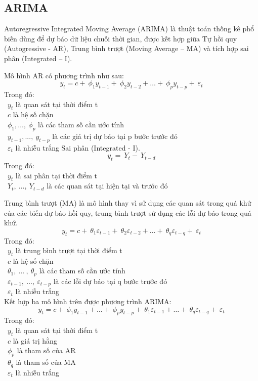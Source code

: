 \subsection{ARIMA}
Autoregressive Integrated Moving Average (ARIMA) là thuật toán thống kê phổ biến dùng để dự báo dữ liệu chuỗi thời gian, được kết hợp giữa Tự hồi quy (Autogressive - AR), Trung bình trượt (Moving Average – MA) và tích hợp sai phân (Integrated – I).
\par
Mô hình AR có phương trình như sau:
\[y_{t} = c + \ \phi_{1}y_{t - 1} + \ \phi_{2}y_{t - 2} + \ldots + \ \phi_{p}y_{t - p} + \ \varepsilon_{t}\]
Trong đó:\\
    \indent\textbullet\ \(y_{t}\) là quan sát tại thời điểm t\\
    \indent\textbullet\ \(c\) là hệ số chặn\\
    \indent\textbullet\ \(\phi_{1},\ldots,\ \phi_{p}\) là các tham số cần ước tính\\
    \indent\textbullet\ \(y_{t - 1},...,\ y_{t - p}\) là các giá trị dự báo tại p bước trước đó\\
    \indent\textbullet\ \(\varepsilon_{t}\) là nhiễu trắng Sai phân (Integrated - I).
\[y_{t} = \ Y_{t} - \ Y_{t - d}\]
Trong đó:\\
    \indent\textbullet\ \(y_{t}\) là sai phân tại thời điểm t\\
    \indent\textbullet\ \(Y_{t},\ \ldots,\ Y_{t - d}\) là các quan sát tại hiện tại và trước đó

Trung bình trượt (MA) là mô hình thay vì sử dụng các quan sát trong quá khứ của các biến dự báo hồi quy, trung bình trượt sử dụng các lỗi dự báo trong quá khứ.
\[y_{t} = c + \ \theta_{1}\varepsilon_{t - 1} + \ \theta_{2}\varepsilon_{t - 2} + \ldots + \ \theta_{q}\varepsilon_{t - q} + \ \varepsilon_{t}\]
Trong đó:\\
    \indent\textbullet\ \(y_{t}\) là trung bình trượt tại thời điểm t\\
    \indent\textbullet\ \(c\) là hệ số chặn\\
    \indent\textbullet\ \(\theta_{1},\ \ldots\ ,\ \theta_{p}\) là các tham số cần ước tính\\
    \indent\textbullet\ \(\varepsilon_{t - 1},\ \ldots,\ \varepsilon_{t - p}\) là các lỗi dự báo tại q bước trước đó\\
    \indent\textbullet\ \(\varepsilon_{t}\) là nhiễu trắng
\\Kết hợp ba mô hình trên được phương trình ARIMA:
\[y_{t} = c + \ \phi_{1}y_{t - 1} + \ldots + \ \phi_{p}y_{t - p} + \ \theta_{1}\varepsilon_{t - 1} + \ldots + \ \theta_{q}\varepsilon_{t - q} + \ \varepsilon_{t}\]
Trong đó:\\
    \indent\textbullet\ \(y_{t}\) là quan sát tại thời điểm t\\
    \indent\textbullet\ \(c\) là giá trị hằng\\
    \indent\textbullet\ \(\phi_{p}\) là tham số của AR\\
    \indent\textbullet\ \(\theta_{q}\) là tham số của MA\\
    \indent\textbullet\ \(\varepsilon_{t}\) là nhiễu trắng

